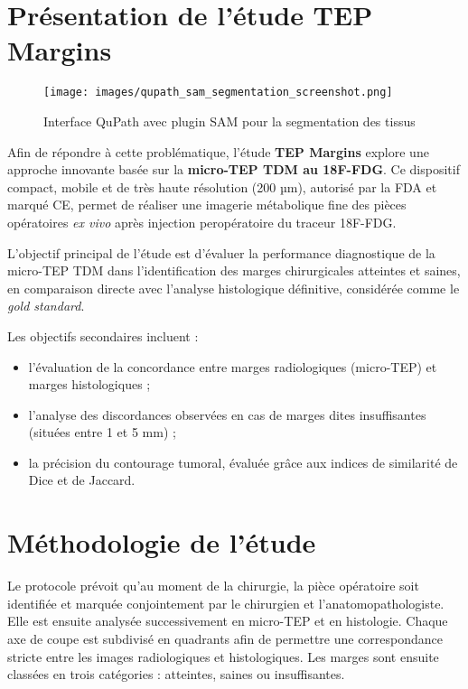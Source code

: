 \documentclass[12pt,a4paper]{report}
\begin{document}
\section{Présentation de l'étude TEP Margins}

\begin{figure}[H]
\centering
\texttt{[image: images/qupath\_sam\_segmentation\_screenshot.png]}
\caption{Interface QuPath avec plugin SAM pour la segmentation des tissus}
\label{fig:qupath_sam}
\end{figure}

Afin de répondre à cette problématique, l'étude \textbf{TEP Margins} explore une approche innovante basée sur la \textbf{micro-TEP TDM au 18F-FDG}. Ce dispositif compact, mobile et de très haute résolution (200 µm), autorisé par la FDA et marqué CE, permet de réaliser une imagerie métabolique fine des pièces opératoires \textit{ex vivo} après injection peropératoire du traceur 18F-FDG.

L'objectif principal de l'étude est d'évaluer la performance diagnostique de la micro-TEP TDM dans l'identification des marges chirurgicales atteintes et saines, en comparaison directe avec l'analyse histologique définitive, considérée comme le \textit{gold standard}.

Les objectifs secondaires incluent :
\begin{itemize}
\item l'évaluation de la concordance entre marges radiologiques (micro-TEP) et marges histologiques ;
\item l'analyse des discordances observées en cas de marges dites insuffisantes (situées entre 1 et 5 mm) ;
\item la précision du contourage tumoral, évaluée grâce aux indices de similarité de Dice et de Jaccard.
\end{itemize}

\section{Méthodologie de l'étude}

Le protocole prévoit qu'au moment de la chirurgie, la pièce opératoire soit identifiée et marquée conjointement par le chirurgien et l'anatomopathologiste. Elle est ensuite analysée successivement en micro-TEP et en histologie. Chaque axe de coupe est subdivisé en quadrants afin de permettre une correspondance stricte entre les images radiologiques et histologiques. Les marges sont ensuite classées en trois catégories : atteintes, saines ou insuffisantes.
\end{document}
